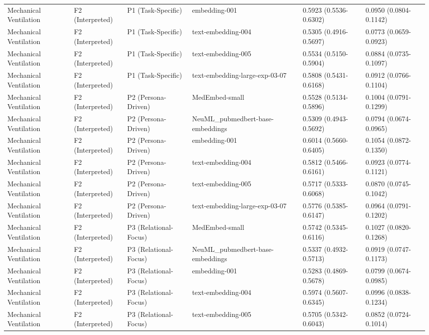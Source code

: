 \begin{tabular}{llllll}
Mechanical Ventilation & F2 (Interpreted) & P1 (Task-Specific) & embedding-001 & 0.5923 (0.5536-0.6302) & 0.0950 (0.0804-0.1142) \\
Mechanical Ventilation & F2 (Interpreted) & P1 (Task-Specific) & text-embedding-004 & 0.5305 (0.4916-0.5697) & 0.0773 (0.0659-0.0923) \\
Mechanical Ventilation & F2 (Interpreted) & P1 (Task-Specific) & text-embedding-005 & 0.5534 (0.5150-0.5904) & 0.0884 (0.0735-0.1097) \\
Mechanical Ventilation & F2 (Interpreted) & P1 (Task-Specific) & text-embedding-large-exp-03-07 & 0.5808 (0.5431-0.6168) & 0.0912 (0.0766-0.1104) \\
Mechanical Ventilation & F2 (Interpreted) & P2 (Persona-Driven) & MedEmbed-small & 0.5528 (0.5134-0.5896) & 0.1004 (0.0791-0.1299) \\
Mechanical Ventilation & F2 (Interpreted) & P2 (Persona-Driven) & NeuML\_pubmedbert-base-embeddings & 0.5309 (0.4943-0.5692) & 0.0794 (0.0674-0.0965) \\
Mechanical Ventilation & F2 (Interpreted) & P2 (Persona-Driven) & embedding-001 & 0.6014 (0.5660-0.6405) & 0.1054 (0.0872-0.1350) \\
Mechanical Ventilation & F2 (Interpreted) & P2 (Persona-Driven) & text-embedding-004 & 0.5812 (0.5466-0.6161) & 0.0923 (0.0774-0.1121) \\
Mechanical Ventilation & F2 (Interpreted) & P2 (Persona-Driven) & text-embedding-005 & 0.5717 (0.5333-0.6068) & 0.0870 (0.0745-0.1042) \\
Mechanical Ventilation & F2 (Interpreted) & P2 (Persona-Driven) & text-embedding-large-exp-03-07 & 0.5776 (0.5385-0.6147) & 0.0964 (0.0791-0.1202) \\
Mechanical Ventilation & F2 (Interpreted) & P3 (Relational-Focus) & MedEmbed-small & 0.5742 (0.5345-0.6116) & 0.1027 (0.0820-0.1268) \\
Mechanical Ventilation & F2 (Interpreted) & P3 (Relational-Focus) & NeuML\_pubmedbert-base-embeddings & 0.5337 (0.4932-0.5713) & 0.0919 (0.0747-0.1173) \\
Mechanical Ventilation & F2 (Interpreted) & P3 (Relational-Focus) & embedding-001 & 0.5283 (0.4869-0.5678) & 0.0799 (0.0674-0.0985) \\
Mechanical Ventilation & F2 (Interpreted) & P3 (Relational-Focus) & text-embedding-004 & 0.5974 (0.5607-0.6345) & 0.0996 (0.0838-0.1234) \\
Mechanical Ventilation & F2 (Interpreted) & P3 (Relational-Focus) & text-embedding-005 & 0.5705 (0.5342-0.6043) & 0.0852 (0.0724-0.1014) \\

\end{tabular}
